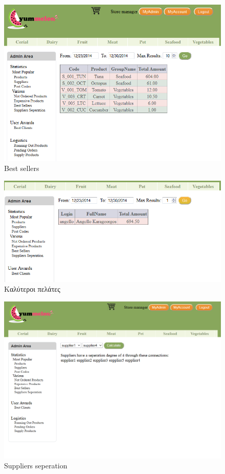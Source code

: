 \documentclass[12pt]{article}
\begin{document}
		\begin{figure}[H]
			\centering
			\includegraphics[width=1\textwidth]{adminArea}
			\caption{Best sellers}
		\end{figure}
		\begin{figure}[H]
			\centering
			\includegraphics[width=1\textwidth]{topCustomers}
			\caption{Καλύτεροι πελάτες}
		\end{figure}  	
		\begin{figure}[H]
			\centering
			\includegraphics[width=1\textwidth]{suppliersSeperation}
			\caption{Suppliers seperation}
		\end{figure} 
\end{document}

